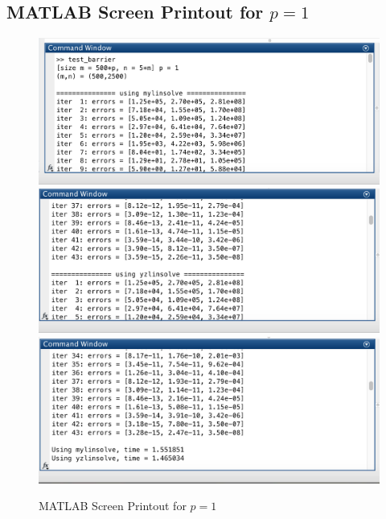 \subsection*{MATLAB Screen Printout for $p=1$}
\begin{figure}[H]
\centering
\includegraphics[width=16cm]{f_3}
\includegraphics[width=16cm]{f_4}
\includegraphics[width=16cm]{f_5}
\caption{MATLAB Screen Printout for $p=1$}
\end{figure}
